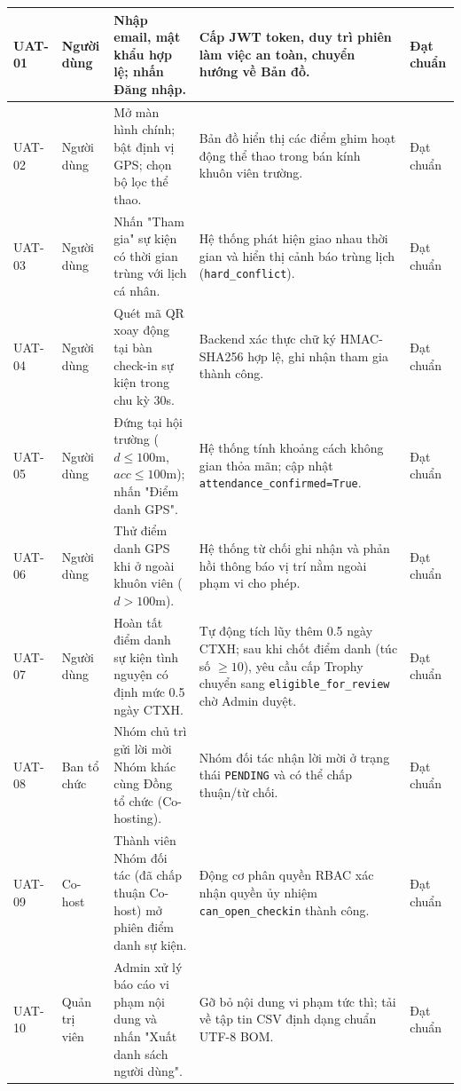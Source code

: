 \begin{xltabular}{\textwidth}{|>{\centering\arraybackslash}p{1.4cm}|>{\raggedright\arraybackslash}p{1.8cm}|>{\raggedright\arraybackslash}X|>{\raggedright\arraybackslash}X|>{\centering\arraybackslash}p{1.6cm}|}
UAT-01 & Người dùng & Nhập email, mật khẩu hợp lệ; nhấn Đăng nhập. & Cấp JWT token, duy trì phiên làm việc an toàn, chuyển hướng về Bản đồ. & Đạt chuẩn \\ \hline
UAT-02 & Người dùng & Mở màn hình chính; bật định vị GPS; chọn bộ lọc thể thao. & Bản đồ hiển thị các điểm ghim hoạt động thể thao trong bán kính khuôn viên trường. & Đạt chuẩn \\ \hline
UAT-03 & Người dùng & Nhấn "Tham gia" sự kiện có thời gian trùng với lịch cá nhân. & Hệ thống phát hiện giao nhau thời gian và hiển thị cảnh báo trùng lịch (\texttt{hard\_conflict}). & Đạt chuẩn \\ \hline
UAT-04 & Người dùng & Quét mã QR xoay động tại bàn check-in sự kiện trong chu kỳ 30s. & Backend xác thực chữ ký HMAC-SHA256 hợp lệ, ghi nhận tham gia thành công. & Đạt chuẩn \\ \hline
UAT-05 & Người dùng & Đứng tại hội trường ($d \le 100$m, $acc \le 100$m); nhấn "Điểm danh GPS". & Hệ thống tính khoảng cách không gian thỏa mãn; cập nhật \texttt{attendance\_confirmed=True}. & Đạt chuẩn \\ \hline
UAT-06 & Người dùng & Thử điểm danh GPS khi ở ngoài khuôn viên ($d > 100$m). & Hệ thống từ chối ghi nhận và phản hồi thông báo vị trí nằm ngoài phạm vi cho phép. & Đạt chuẩn \\ \hline
UAT-07 & Người dùng & Hoàn tất điểm danh sự kiện tình nguyện có định mức 0.5 ngày CTXH. & Tự động tích lũy thêm 0.5 ngày CTXH; sau khi chốt điểm danh (túc số $\ge 10$), yêu cầu cấp Trophy chuyển sang \texttt{eligible\_for\_review} chờ Admin duyệt. & Đạt chuẩn \\ \hline
UAT-08 & Ban tổ chức & Nhóm chủ trì gửi lời mời Nhóm khác cùng Đồng tổ chức (Co-hosting). & Nhóm đối tác nhận lời mời ở trạng thái \texttt{PENDING} và có thể chấp thuận/từ chối. & Đạt chuẩn \\ \hline
UAT-09 & Co-host & Thành viên Nhóm đối tác (đã chấp thuận Co-host) mở phiên điểm danh sự kiện. & Động cơ phân quyền RBAC xác nhận quyền ủy nhiệm \texttt{can\_open\_checkin} thành công. & Đạt chuẩn \\ \hline
UAT-10 & Quản trị viên & Admin xử lý báo cáo vi phạm nội dung và nhấn "Xuất danh sách người dùng". & Gỡ bỏ nội dung vi phạm tức thì; tải về tập tin CSV định dạng chuẩn UTF-8 BOM. & Đạt chuẩn \\ \hline
\end{xltabular}
\endgroup
